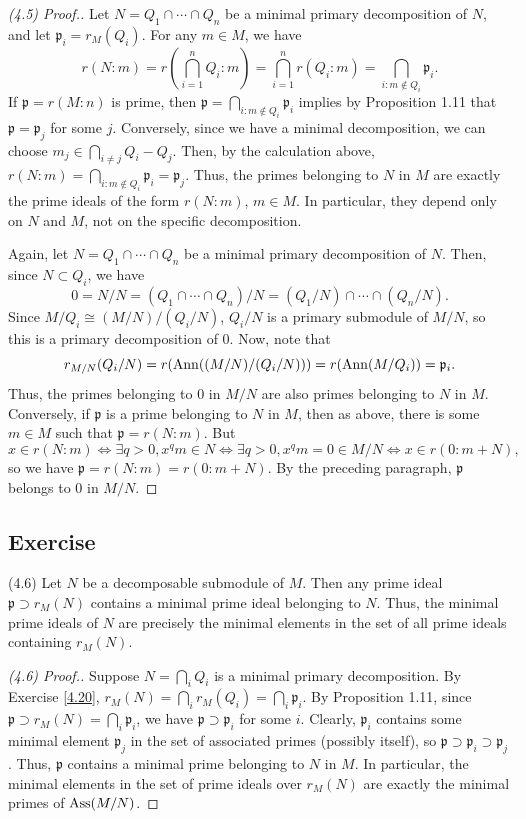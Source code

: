 \begin{proof}[(4.5) Proof.]
Let $N = Q_1 \cap \cdots \cap Q_n$ be a minimal primary decomposition of $N$, and let $\mathfrak{p}_i = r_M(Q_i)$. For any $m \in M$, we have
$$r(N:m) = r\left(\bigcap_{i=1}^n Q_i : m\right) = \bigcap_{i=1}^n r(Q_i : m) = \bigcap_{i : m \not\in Q_i} \mathfrak{p}_i.$$
If $\mathfrak{p} = r(M:n)$ is prime, then $\mathfrak{p} = \bigcap_{i : m \not\in Q_i} \mathfrak{p}_i$ implies by Proposition 1.11 that
$\mathfrak{p} = \mathfrak{p}_j$ for some $j$. Conversely, since we have a minimal decomposition, we can choose $m_j \in \bigcap_{i\neq j}Q_i - Q_j$.
Then, by the calculation above, $r(N:m) = \bigcap_{i:m \not\in Q_i}\mathfrak{p}_i = \mathfrak{p}_j$. Thus, the primes belonging to $N$ in $M$ are exactly the 
prime ideals of the form $r(N:m)$, $m \in M$. In particular, they depend only on $N$ and $M$, not on the specific decomposition.

Again, let $N = Q_1 \cap \cdots \cap Q_n$ be a minimal primary decomposition of $N$. Then, since $N \subset Q_i$, we have
$$0 = N/N = (Q_1 \cap \cdots \cap Q_n)/ N = (Q_1/N) \cap \cdots \cap (Q_n/N).$$
Since $M/Q_i \cong (M/N)/(Q_i/N)$, $Q_i/N$ is a primary submodule of $M/N$, so this is a primary decomposition of $0$. Now, note that
$$r_{M/N}(Q_i/N) = r(\operatorname{Ann}((M/N)/(Q_i/N))) = r(\operatorname{Ann}(M/Q_i)) = \mathfrak{p}_i.$$
Thus, the primes belonging to $0$ in $M/N$ are also primes belonging to $N$ in $M$. Conversely, if $\mathfrak{p}$ is a prime belonging to $N$ in $M$, then
as above, there is some $m \in M$ such that $\mathfrak{p} = r(N:m)$. But
$$x \in r(N:m) \iff \exists q > 0, x^q m \in N \iff \exists q > 0, x^q m = 0 \in M/N \iff x \in r(0:m+N),$$
so we have $\mathfrak{p} = r(N:m) = r(0:m+N)$. By the preceding paragraph, $\mathfrak{p}$ belongs to $0$ in $M/N$.
\end{proof}

\subsection{Exercise}\label{4.23}

(4.6) Let $N$ be a decomposable submodule of $M$. Then any prime ideal $\mathfrak{p} \supset r_M(N)$ contains a minimal prime ideal belonging to $N$. Thus,
the minimal prime ideals of $N$ are precisely the minimal elements in the set of all prime ideals containing $r_M(N)$.

\begin{proof}[(4.6) Proof.]
Suppose $N = \bigcap_i Q_i$ is a minimal primary decomposition. By Exercise \ref{4.20}, $r_M(N) = \bigcap_i r_M(Q_i) = \bigcap_i \mathfrak{p}_i$. By Proposition 1.11,
since $\mathfrak{p} \supset r_M(N) = \bigcap_i \mathfrak{p}_i$, we have $\mathfrak{p} \supset \mathfrak{p}_i$ for some $i$. Clearly, $\mathfrak{p}_i$ contains some minimal
element $\mathfrak{p}_j$ in the set of associated primes (possibly itself), so $\mathfrak{p} \supset \mathfrak{p}_i \supset \mathfrak{p}_j$. Thus, $\mathfrak{p}$ contains 
a minimal prime belonging to $N$ in $M$. In particular, the minimal elements in the set of prime ideals over $r_M(N)$ are exactly the minimal primes of $\operatorname{Ass}(M/N)$.
\end{proof}

